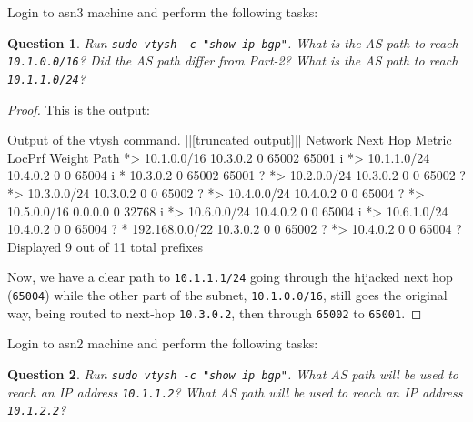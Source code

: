 \documentclass[a4paper,11pt,hidelinks]{article}
\newtheorem{theorem}{Question}[subsection]
\begin{document}
Login to asn3 machine and perform the following tasks:

\begin{theorem}
    Run \verb=sudo vtysh -c "show ip bgp"=. What is the AS path to reach \verb=10.1.0.0/16=? Did the AS path differ from Part-2? What is the AS path to reach \verb=10.1.1.0/24=?
\end{theorem}

\begin{proof}
    This is the output:

\begin{code}{Output of the vtysh command.}
||[truncated output]||
Network          Next Hop            Metric LocPrf Weight Path
*> 10.1.0.0/16      10.3.0.2                               0 65002 65001 i
*> 10.1.1.0/24      10.4.0.2                 0             0 65004 i
*                   10.3.0.2                               0 65002 65001 ?
*> 10.2.0.0/24      10.3.0.2                 0             0 65002 ?
*> 10.3.0.0/24      10.3.0.2                 0             0 65002 ?
*> 10.4.0.0/24      10.4.0.2                 0             0 65004 ?
*> 10.5.0.0/16      0.0.0.0                  0         32768 i
*> 10.6.0.0/24      10.4.0.2                 0             0 65004 i
*> 10.6.1.0/24      10.4.0.2                 0             0 65004 ?
*  192.168.0.0/22   10.3.0.2                 0             0 65002 ?
*>                  10.4.0.2                 0             0 65004 ?
Displayed  9 out of 11 total prefixes
\end{code}

    Now, we have a clear path to \verb=10.1.1.1/24= going through the hijacked next hop (\verb=65004=) while the other part of the subnet, \verb=10.1.0.0/16=, still goes the original way, being routed to next-hop \verb=10.3.0.2=, then through \verb=65002= to \verb=65001=.
\end{proof}

Login to asn2 machine and perform the following tasks:

\begin{theorem}
    Run \verb=sudo vtysh -c "show ip bgp"=. What AS path will be used to reach an IP address \verb=10.1.1.2=? What AS path will be used to reach an IP address \verb=10.1.2.2=?
\end{theorem}
\end{document}
